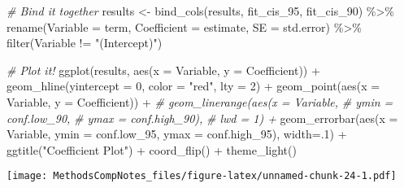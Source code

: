 \documentclass[
]{article}
\newenvironment{Shaded}{\begin{snugshade}}{\end{snugshade}}
\newcommand{\AttributeTok}[1]{\textcolor[rgb]{0.77,0.63,0.00}{#1}}
\newcommand{\CommentTok}[1]{\textcolor[rgb]{0.56,0.35,0.01}{\textit{#1}}}
\newcommand{\DecValTok}[1]{\textcolor[rgb]{0.00,0.00,0.81}{#1}}
\newcommand{\FunctionTok}[1]{\textcolor[rgb]{0.00,0.00,0.00}{#1}}
\newcommand{\NormalTok}[1]{#1}
\newcommand{\OtherTok}[1]{\textcolor[rgb]{0.56,0.35,0.01}{#1}}
\newcommand{\SpecialCharTok}[1]{\textcolor[rgb]{0.00,0.00,0.00}{#1}}
\newcommand{\StringTok}[1]{\textcolor[rgb]{0.31,0.60,0.02}{#1}}
\begin{document}
\begin{Shaded}
\begin{Highlighting}[]
\CommentTok{\# Bind it together}
\NormalTok{results }\OtherTok{\textless{}{-}} \FunctionTok{bind\_cols}\NormalTok{(results, }
\NormalTok{                     fit\_cis\_95, }
\NormalTok{                     fit\_cis\_90) }\SpecialCharTok{\%\textgreater{}\%}
           \FunctionTok{rename}\NormalTok{(}\AttributeTok{Variable =}\NormalTok{ term,}
                  \AttributeTok{Coefficient =}\NormalTok{ estimate,}
                  \AttributeTok{SE =}\NormalTok{ std.error) }\SpecialCharTok{\%\textgreater{}\%}
           \FunctionTok{filter}\NormalTok{(Variable }\SpecialCharTok{!=} \StringTok{"(Intercept)"}\NormalTok{)}

\CommentTok{\# Plot it!}
\FunctionTok{ggplot}\NormalTok{(results, }\FunctionTok{aes}\NormalTok{(}\AttributeTok{x =}\NormalTok{ Variable, }\AttributeTok{y =}\NormalTok{ Coefficient)) }\SpecialCharTok{+}
        \FunctionTok{geom\_hline}\NormalTok{(}\AttributeTok{yintercept =} \DecValTok{0}\NormalTok{, }\AttributeTok{color =} \StringTok{"red"}\NormalTok{, }\AttributeTok{lty =} \DecValTok{2}\NormalTok{) }\SpecialCharTok{+}
        \FunctionTok{geom\_point}\NormalTok{(}\FunctionTok{aes}\NormalTok{(}\AttributeTok{x =}\NormalTok{ Variable, }
                    \AttributeTok{y =}\NormalTok{ Coefficient)) }\SpecialCharTok{+} 
        \CommentTok{\# geom\_linerange(aes(x = Variable, }
        \CommentTok{\#              ymin = conf.low\_90,}
        \CommentTok{\#              ymax = conf.high\_90),}
        \CommentTok{\#            lwd = 1) +}
        \FunctionTok{geom\_errorbar}\NormalTok{(}\FunctionTok{aes}\NormalTok{(}\AttributeTok{x =}\NormalTok{ Variable, }
                     \AttributeTok{ymin =}\NormalTok{ conf.low\_95,}
                     \AttributeTok{ymax =}\NormalTok{ conf.high\_95),}
                     \AttributeTok{width=}\NormalTok{.}\DecValTok{1}\NormalTok{) }\SpecialCharTok{+} 
        \FunctionTok{ggtitle}\NormalTok{(}\StringTok{"Coefficient Plot"}\NormalTok{) }\SpecialCharTok{+}
        \FunctionTok{coord\_flip}\NormalTok{() }\SpecialCharTok{+}
  \FunctionTok{theme\_light}\NormalTok{()}
\end{Highlighting}
\end{Shaded}

\texttt{[image: MethodsCompNotes\_files/figure-latex/unnamed-chunk-24-1.pdf]}
\end{document}
